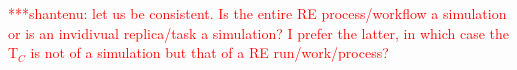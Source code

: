\documentclass{rspublic}
\newcommand{\jhanote}[1]{ {\textcolor{red} { ***shantenu: #1 }}}
\newcommand{\alnote}[1]{ {\textcolor{blue} { ***andre: #1 }}}
\newcommand{\athotanote}[1]{ {\textcolor{green} { ***athota: #1 }}}
\newcommand{\alnote}[1]{}
\newcommand{\athotanote}[1]{}
\newcommand{\jhanote}[1]{}
\begin{document}
\jhanote{let us be consistent. Is the entire RE process/workflow a  simulation or is an invidivual replica/task a simulation? I prefer  the latter, in which case the T$_C$ is not of a simulation but that  of a RE run/work/process?}  %
\end{document}
